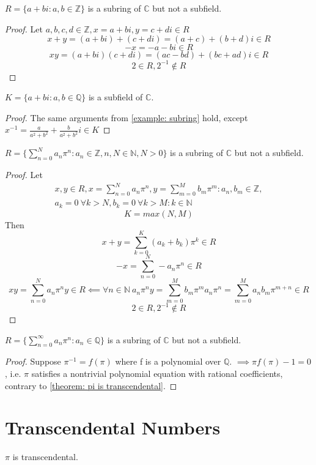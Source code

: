 \documentclass{book}
\begin{document}
    \begin{examples}
    \begin{example} \label{example: subring}
        \(R = \{a + bi : a,b \in \mathbb{Z}\}\) is a subring of \(\mathbb{C}\) but not a subfield.
    \end{example}
    \begin{proof}
        Let \(a,b,c,d \in \mathbb{Z}, x = a + bi, y = c + di \in R\)
        \[x + y = (a + bi) + (c + di) = (a + c) + (b + d)i \in R\]
        \[-x = -a - bi \in R\]
        \[xy = (a + bi)(c + di) = (ac - bd) + (bc + ad)i \in R\]
        \[2 \in R, 2^{-1} \notin R\]
    \end{proof}

    \begin{example}
        \(K = \{a + bi : a,b \in \mathbb{Q}\}\) is a subfield of \(\mathbb{C}\).
    \end{example}
    \begin{proof}
        The same arguments from \cref{example: subring} hold, except
        \(x^{-1} = \frac{a}{a^2 + b^2} + \frac{b}{a^2 + b^2}i \in K\)
    \end{proof}

    \begin{example}
        \(R = \{\sum_{n = 0}^N a_n\pi^n : a_n \in \mathbb{Z},n,N \in \mathbb{N},N > 0\}\) is a subring of \(\mathbb{C}\) but not a subfield.
    \end{example}
    \begin{proof}
        Let 
        \begin{equation*}
        \begin{split}
            x, y \in R, 
            x = \sum_{n = 0}^N a_n\pi^n, 
            y = \sum_{m = 0}^M b_m\pi^m
             : a_n,b_m \in \mathbb{Z},\\
            a_k = 0\ \forall k > N,
            b_k = 0\ \forall k > M : k \in \mathbb{N}
        \end{split}
        \end{equation*}
        \[K = max(N, M)\]
        Then
        \[x + y = \sum_{k = 0}^K (a_k + b_k)\pi^k \in R\]
        \[-x = \sum_{n = 0}^N -a_n\pi^n \in R\]
        \[
            xy = \sum_{n = 0}^N a_n\pi^ny \in R \impliedby
            \forall n \in \mathbb{N} \ a_n\pi^ny = 
            \sum_{m = 0}^M b_m\pi^ma_n\pi^n = 
            \sum_{m = 0}^M a_nb_m\pi^{m + n} \in R
        \]
        \[2 \in R, 2^{-1} \notin R\]
    \end{proof}

    \begin{example}
        \(R = \{\sum_{n = 0}^\infty a_n\pi^n : a_n \in \mathbb{Q}\}\) is a subring of \(\mathbb{C}\) but not a subfield.
    \end{example}
    \begin{proof}
        Suppose \(\pi^{-1} = f(\pi)\) where f is a polynomial over \(\mathbb{Q}\).
        \(\implies \pi f(\pi) - 1 = 0\), i.e. \(\pi\) satisfies a nontrivial polynomial equation with rational coefficients,
        contrary to \cref{theorem: pi is transcendental}. 
    \end{proof}
    \end{examples}

    \chapter{Transcendental Numbers}
    \begin{theorem} \label{theorem: pi is transcendental}
        \(\pi\) is transcendental.
    \end{theorem}
\end{document}
